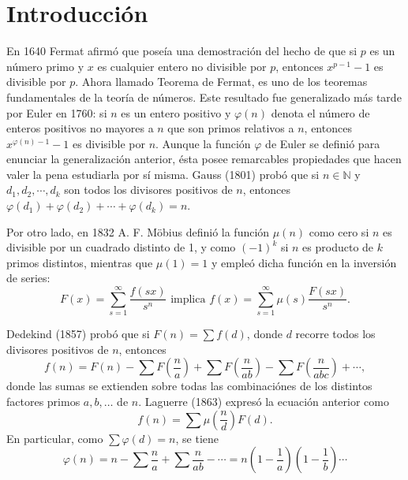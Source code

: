 \newpage
\pagestyle{title-subsection}
\section*{Introducción}

En 1640 Fermat afirmó que poseía una demostración del hecho de que si $p$ es un número primo y $x$ es cualquier entero no divisible por $p$, entonces $x^{p-1}-1$ es divisible por $p$. Ahora llamado Teorema de Fermat, es uno de los teoremas fundamentales de la teoría de números. Este resultado fue generalizado más tarde por Euler en 1760: si $n$ es un entero positivo y $\varphi(n)$ denota el número de enteros positivos no mayores a $n$ que son primos relativos a $n$, entonces $x^{\varphi(n)-1}-1$ es divisible por $n$.
Aunque la función $\varphi$ de Euler se definió para enunciar la generalización anterior, ésta posee remarcables propiedades que hacen valer la pena estudiarla por sí misma. Gauss (1801) probó que si $n\in\mathbb{N}$ y $d_1,d_2,\cdots,d_k$ son todos los divisores positivos de $n$, entonces $\varphi(d_1)+\varphi(d_2)+\cdots+\varphi(d_k)=n$.
\bigskip

Por otro lado, en 1832 A. F. Möbius definió la función $\mu(n)$ como cero si $n$ es divisible por un cuadrado distinto de 1, y como $(-1)^k$ si $n$ es producto de $k$ primos distintos, mientras que $\mu(1)=1$ y empleó dicha función en la inversión de series:
\begin{equation*}
    F(x) = \sum_{s=1}^{\infty} \frac{f(s x)}{s^n} \text{ implica } f(x) = \sum_{s=1}^{\infty} \mu(s) \frac{F(s x)}{s^n}.
\end{equation*}

Dedekind (1857) probó que si $F(n) = \sum f(d)$, donde $d$ recorre todos los divisores positivos de $n$, entonces
\begin{equation*}
    f(n) = F(n) - \sum F \left( \frac{n}{a} \right) + \sum F \left(  \frac{n}{a b} \right) - \sum F \left( \frac{n}{a b c} \right) + \cdots,
\end{equation*}
donde las sumas se extienden sobre todas las combinaciónes de los distintos factores primos $a, b, \ldots$ de $n$. Laguerre (1863) expresó la ecuación anterior como
\begin{equation*}
    f(n) = \sum \mu \left(  \frac{n}{d} \right) F(d).
\end{equation*}
En particular, como $\sum \varphi(d) = n$, se tiene
\begin{equation*}
    \varphi(n) = n - \sum \frac{n}{a} + \sum \frac{n}{a b} - \cdots = n \left( 1 - \frac{1}{a} \right) \left( 1 - \frac{1}{b} \right) \cdots
\end{equation*}

